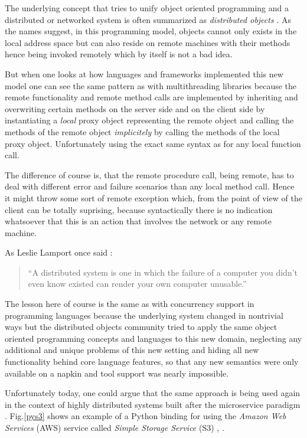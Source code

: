 The underlying concept that tries to unify object oriented programming
and a distributed or networked system is often summarized as
\textit{distributed objects} \cite{distobjects}. As the names suggest,
in this programming model, objects cannot only exists in the local
address space but can also reside on remote machines with their
methods hence being invoked remotely which by itself is not a bad idea.

But when one looks at how languages and frameworks implemented
this new model one can see the same pattern as with multithreading
libraries because the remote functionality and remote method calls are
implemented by inheriting and overwriting certain methods on the server
side and on the client side by instantiating a \textit{local} proxy object
representing the remote object and calling
the methods of the remote object \textit{implicitely} by calling the methods
of the local proxy object. Unfortunately using the exact same
syntax as for any local function call.

The difference of course is, that the remote procedure call, being remote,
has to deal with different error and failure scenarios than any local
method call. Hence it might throw some sort of remote exception which,
from the point of view of the client can be totally suprising, because
syntactically there is no indication whatsoever that this is an action
that involves the network or any remote machine.

As Leslie Lamport once said \cite{lamportquote}:

\begin{quote}
``A distributed system is one in which the failure of a computer
you didn't even know existed can render your own computer unusable.''
\end{quote}

The lesson here of course is the same as with concurrency support in
programming languages because the underlying system changed in nontrivial
ways but the distributed objects community tried to apply the same
object oriented programming concepts and languages to this new domain,
neglecting any additional and unique problems of this new setting and
hiding all new functionality behind core language features, so that
any new semantics were only available on a napkin and tool support
was nearly impossible.
\newline

Unfortunately today, one could argue that the same approach is being
used again in the context of highly distributed systems built after
the microservice paradigm \cite{microservices}. Fig.\ref{pys3} shows
an example of a Python binding for using the
\textit{Amazon Web Services} (AWS)
service called \textit{Simple Storage Service} (S3) \cite{aws}, \cite{aws-s3}.

